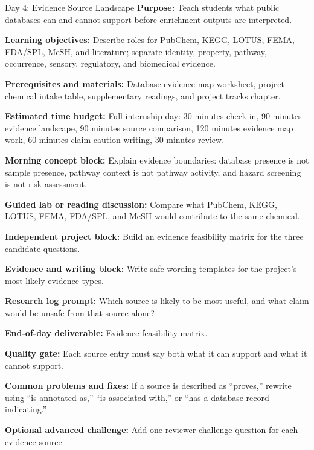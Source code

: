 \begin{dailybox}{Day 4: Evidence Source Landscape}
\textbf{Purpose:} Teach students what public databases can and cannot support before enrichment outputs are interpreted.

\textbf{Learning objectives:} Describe roles for PubChem, KEGG, LOTUS, FEMA, FDA/SPL, MeSH, and literature; separate identity, property, pathway, occurrence, sensory, regulatory, and biomedical evidence.

\textbf{Prerequisites and materials:} Database evidence map worksheet, project chemical intake table, supplementary readings, and project tracks chapter.

\textbf{Estimated time budget:} Full internship day: 30 minutes check-in, 90 minutes evidence landscape, 90 minutes source comparison, 120 minutes evidence map work, 60 minutes claim caution writing, 30 minutes review.

\textbf{Morning concept block:} Explain evidence boundaries: database presence is not sample presence, pathway context is not pathway activity, and hazard screening is not risk assessment.

\textbf{Guided lab or reading discussion:} Compare what PubChem, KEGG, LOTUS, FEMA, FDA/SPL, and MeSH would contribute to the same chemical.

\textbf{Independent project block:} Build an evidence feasibility matrix for the three candidate questions.

\textbf{Evidence and writing block:} Write safe wording templates for the project's most likely evidence types.

\textbf{Research log prompt:} Which source is likely to be most useful, and what claim would be unsafe from that source alone?

\textbf{End-of-day deliverable:} Evidence feasibility matrix.

\textbf{Quality gate:} Each source entry must say both what it can support and what it cannot support.

\textbf{Common problems and fixes:} If a source is described as ``proves,'' rewrite using ``is annotated as,'' ``is associated with,'' or ``has a database record indicating.''

\textbf{Optional advanced challenge:} Add one reviewer challenge question for each evidence source.
\end{dailybox}

